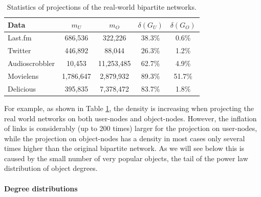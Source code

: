 \begin{table}[!h] \centering
\begin{tabular}{ l | c c c c }
Data & $m_U$ & $m_O$ & $\delta(G_U)$ & $\delta(G_O)$ \\
\hline
Last.fm & 686,536 & 322,226 & 38.3\% & 0.6\% \\
Twitter & 446,892 & 88,044 & 26.3\% & 1.2\% \\
Audioscrobbler & 10,453 & 11,253,485 & 62.7\% & 4.9\% \\
Movielens & 1,786,647 & 2,879,932 & 89.3\% & 51.7\% \\
Delicious & 395,835 & 7,378,472 & 83.7\% & 1.8\% \\
\end{tabular}
\caption{Statistics of projections of the real-world bipartite networks.}
\label{tab:datasets_prj}
\end{table}

For example, as shown in Table \ref{tab:datasets_prj}, the density is increasing
when projecting the real world networks on both user-nodes and object-nodes.
However, the inflation of links is considerably (up to 200 times) larger for the
projection on user-nodes, while the projection on object-nodes has a density in
most cases only several times higher than the original bipartite network. As we
will see below this is caused by the small number of very popular objects, the
tail of the power law distribution of object degrees.

\paragraph{Degree distributions}

